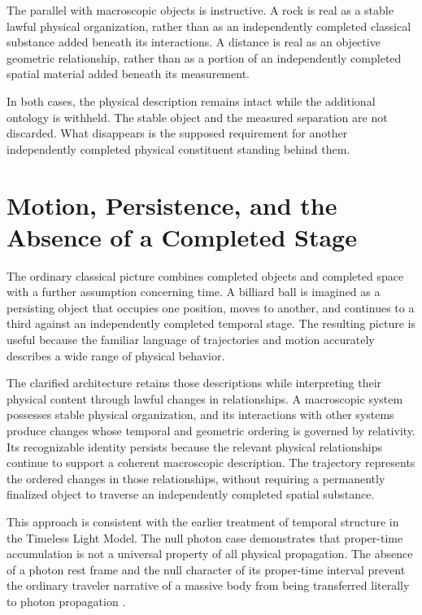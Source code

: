 \documentclass[12pt,onecolumn]{article}
\begin{document}
The parallel with macroscopic objects is instructive. A rock is real as a stable lawful physical organization, rather than as an independently completed classical substance added beneath its interactions. A distance is real as an objective geometric relationship, rather than as a portion of an independently completed spatial material added beneath its measurement.

In both cases, the physical description remains intact while the additional ontology is withheld. The stable object and the measured separation are not discarded. What disappears is the supposed requirement for another independently completed physical constituent standing behind them.

\section{Motion, Persistence, and the Absence of a Completed Stage}

The ordinary classical picture combines completed objects and completed space with a further assumption concerning time. A billiard ball is imagined as a persisting object that occupies one position, moves to another, and continues to a third against an independently completed temporal stage. The resulting picture is useful because the familiar language of trajectories and motion accurately describes a wide range of physical behavior.

The clarified architecture retains those descriptions while interpreting their physical content through lawful changes in relationships. A macroscopic system possesses stable physical organization, and its interactions with other systems produce changes whose temporal and geometric ordering is governed by relativity. Its recognizable identity persists because the relevant physical relationships continue to support a coherent macroscopic description. The trajectory represents the ordered changes in those relationships, without requiring a permanently finalized object to traverse an independently completed spatial substance.

This approach is consistent with the earlier treatment of temporal structure in the Timeless Light Model. The null photon case demonstrates that proper-time accumulation is not a universal property of all physical propagation. The absence of a photon rest frame and the null character of its proper-time interval prevent the ordinary traveler narrative of a massive body from being transferred literally to photon propagation \cite{NullProperTime2025,WavefunctionNoGo2026}.
\end{document}
